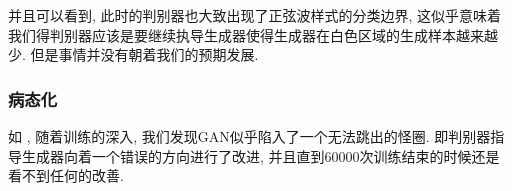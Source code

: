 \documentclass[lang=cn,11pt]{elegantpaper}
\begin{document}
并且可以看到, 此时的判别器也大致出现了正弦波样式的分类边界, 这似乎意味着我们得判别器应该是要继续执导生成器使得生成器在白色区域的生成样本越来越少. 但是事情并没有朝着我们的预期发展. 


\subsubsection{病态化}

如 , 随着训练的深入, 我们发现GAN似乎陷入了一个无法跳出的怪圈. 即判别器指导生成器向着一个错误的方向进行了改进, 并且直到60000次训练结束的时候还是看不到任何的改善. 
\end{document}
